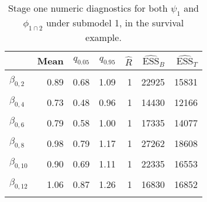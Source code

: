 \begin{table}

\caption{\label{tab:surv-stage-one-submodel-one}Stage one numeric diagnostics for both $\psi_{1}$ and $\phi_{1 \cap 2}$ under submodel 1, in the survival example.}
\centering
\begin{tabular}[t]{lrrrrrr}
\toprule
  & Mean & $q_{0.05}$ & $q_{0.95}$ & $\widehat{R}$ & $\widehat{\text{ESS}}_{B}$ & $\widehat{\text{ESS}}_{T}$\\
\midrule
\cellcolor{gray!6}{$\beta_{0, 1}$} & \cellcolor{gray!6}{0.86} & \cellcolor{gray!6}{0.64} & \cellcolor{gray!6}{1.07} & \cellcolor{gray!6}{1} & \cellcolor{gray!6}{24204} & \cellcolor{gray!6}{15567}\\
$\beta_{0, 2}$ & 0.89 & 0.68 & 1.09 & 1 & 22925 & 15831\\
\cellcolor{gray!6}{$\beta_{0, 3}$} & \cellcolor{gray!6}{0.86} & \cellcolor{gray!6}{0.64} & \cellcolor{gray!6}{1.08} & \cellcolor{gray!6}{1} & \cellcolor{gray!6}{21624} & \cellcolor{gray!6}{15473}\\
$\beta_{0, 4}$ & 0.73 & 0.48 & 0.96 & 1 & 14430 & 12166\\
\cellcolor{gray!6}{$\beta_{0, 5}$} & \cellcolor{gray!6}{0.92} & \cellcolor{gray!6}{0.70} & \cellcolor{gray!6}{1.14} & \cellcolor{gray!6}{1} & \cellcolor{gray!6}{24675} & \cellcolor{gray!6}{16525}\\
$\beta_{0, 6}$ & 0.79 & 0.58 & 1.00 & 1 & 17335 & 14077\\
\cellcolor{gray!6}{$\beta_{0, 7}$} & \cellcolor{gray!6}{0.68} & \cellcolor{gray!6}{0.41} & \cellcolor{gray!6}{0.93} & \cellcolor{gray!6}{1} & \cellcolor{gray!6}{11531} & \cellcolor{gray!6}{9840}\\
$\beta_{0, 8}$ & 0.98 & 0.79 & 1.17 & 1 & 27262 & 18608\\
\cellcolor{gray!6}{$\beta_{0, 9}$} & \cellcolor{gray!6}{0.90} & \cellcolor{gray!6}{0.63} & \cellcolor{gray!6}{1.19} & \cellcolor{gray!6}{1} & \cellcolor{gray!6}{18093} & \cellcolor{gray!6}{13035}\\
$\beta_{0, 10}$ & 0.90 & 0.69 & 1.11 & 1 & 22335 & 16553\\
\cellcolor{gray!6}{$\beta_{0, 11}$} & \cellcolor{gray!6}{0.67} & \cellcolor{gray!6}{0.48} & \cellcolor{gray!6}{0.86} & \cellcolor{gray!6}{1} & \cellcolor{gray!6}{14280} & \cellcolor{gray!6}{13806}\\
$\beta_{0, 12}$ & 1.06 & 0.87 & 1.26 & 1 & 16830 & 16852\\
\cellcolor{gray!6}{$\beta_{0, 13}$} & \cellcolor{gray!6}{0.89} & \cellcolor{gray!6}{0.63} & \cellcolor{gray!6}{1.16} & \cellcolor{gray!6}{1} & \cellcolor{gray!6}{19147} & \cellcolor{gray!6}{14326}\\

\end{tabular}
\end{table}
